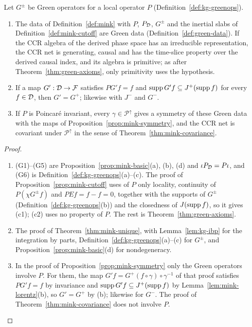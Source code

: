 \begin{theorem}\label{thm:kg-greenops}
Let $G^\pm$ be Green operators for a local operator $P$ (Definition~\ref{def:kg-greenops}).
\begin{enumerate}[label=(\alph*),leftmargin=2.5em]
\item The data of Definition~\ref{def:mink} with $P$, $P_\mathcal D$, $G^\pm$ and the inertial slabs of
Definition~\ref{def:mink-cutoff} are Green data (Definition~\ref{def:green-data}). If the CCR algebra
of the derived phase space has an irreducible representation, the CCR net is generating, causal and
has the time-slice property over the derived causal index, and its algebra is primitive; as after
Theorem~\ref{thm:green-axioms}, only primitivity uses the hypothesis.
\item If a map $G':\mathcal D\to\mathcal F$ satisfies $PG'f=f$ and $\operatorname{supp} G'f\subseteq J^+(\operatorname{supp} f)$ for every
$f\in\mathcal D$, then $G'=G^+$; likewise with $J^-$ and $G^-$.
\item If $P$ is Poincar\'e invariant, every $\gamma\in\mathcal P^\uparrow$ gives a symmetry of these
Green data with the maps of Proposition~\ref{prop:mink-symmetry}, and the CCR net is covariant under
$\mathcal P^\uparrow$ in the sense of Theorem~\ref{thm:mink-covariance}.
\end{enumerate}
\end{theorem}
\begin{proof}
\begin{enumerate}[leftmargin=2.5em]
\item[(a)] (G1)--(G5) are Proposition~\ref{prop:mink-basic}(a), (b), (d) and $\iota P_\mathcal D=P\iota$,
and (G6) is Definition~\ref{def:kg-greenops}(a)--(c). The proof of Proposition~\ref{prop:mink-cutoff}
uses of $P$ only locality, continuity of $P(\chi G^\pm f)$ and $PEf=f-f=0$, together with the
supports of $G^\pm$ (Definition~\ref{def:kg-greenops}(b)) and the closedness of $J(\operatorname{supp} f)$, so it
gives (c1); (c2) uses no property of $P$. The rest is Theorem~\ref{thm:green-axioms}.
\item[(b)] The proof of Theorem~\ref{thm:mink-unique}, with Lemma~\ref{lem:kg-ibp} for the
integration by parts, Definition~\ref{def:kg-greenops}(a)--(c) for $G^\pm$, and
Proposition~\ref{prop:mink-basic}(d) for nondegeneracy.
\item[(c)] In the proof of Proposition~\ref{prop:mink-symmetry} only the Green operators involve $P$.
For them, the map $G'f=G^+(f\circ\gamma)\circ\gamma^{-1}$ of that proof satisfies $PG'f=f$ by
invariance and $\operatorname{supp} G'f\subseteq J^+(\operatorname{supp} f)$ by Lemma~\ref{lem:mink-lorentz}(b), so $G'=G^+$ by
(b); likewise for $G^-$. The proof of Theorem~\ref{thm:mink-covariance} does not involve $P$.
\end{enumerate}
\end{proof}

